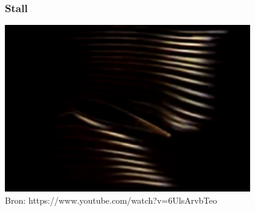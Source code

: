 \documentclass[t]{beamer}
\begin{document}
  	\begin{frame}
		\frametitle{Stall}
		\center
		\href{run:fig/uitwendige_stroming/Streamlines_around_an_airfoil.mp4}{
			\includegraphics[width=0.8\textwidth]{fig/uitwendige_stroming/Streamlines_around_an_airfoil.png}
		}\\
		\footnotesize{Bron: https://www.youtube.com/watch?v=6UlsArvbTeo}
  	\end{frame}
\end{document}
